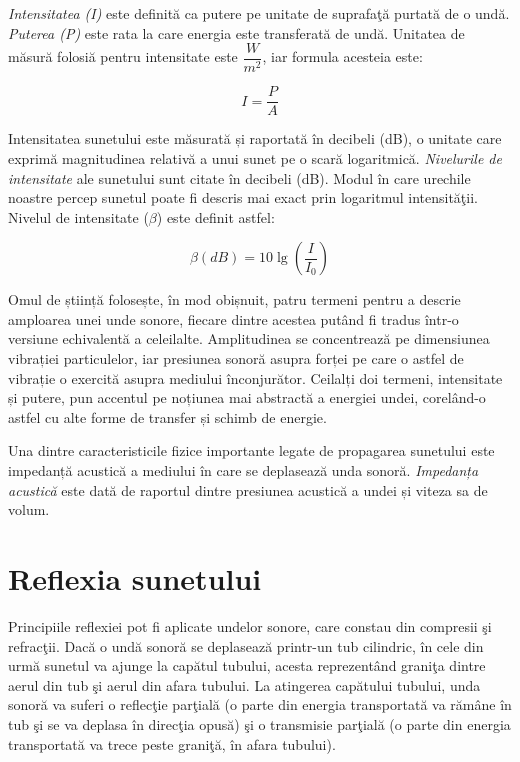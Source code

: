 	{\it{Intensitatea (I)}} este definit\u{a} ca putere pe unitate de suprafa\c{t}\u{a} purtat\u{a} de o und\u{a}. {\it{Puterea (P)}} este rata la care energia este transferat\u{a} de und\u{a}. Unitatea de m\u{a}sur\u{a} folosi\u{a} pentru intensitate este $\dfrac{W}{m^2}$, iar formula acesteia este:
	
	\begin{equation}
	I=\frac{P}{A}
	\end{equation}
	 	
	Intensitatea sunetului este măsurată și raportată în decibeli (dB), o unitate care exprimă magnitudinea relativă a unui sunet pe o scară logaritmică. {\it{Nivelurile de intensitate}} ale sunetului sunt citate în decibeli (dB). Modul în care urechile noastre percep sunetul poate fi descris mai exact prin logaritmul intensit\u{a}\c{t}ii. Nivelul de intensitate ($\beta$) este definit astfel:
	
	\begin{equation}
	\beta(dB) = 10 \lg\left(\dfrac{I}{I_0}\right) 
	\end{equation}

	Omul de știință folosește, în mod obișnuit, patru termeni pentru a descrie amploarea unei unde sonore, fiecare dintre acestea putând fi tradus într-o versiune echivalentă a celeilalte. Amplitudinea se concentrează pe dimensiunea vibrației particulelor, iar presiunea sonoră asupra forței pe care o astfel de vibrație o exercită asupra mediului înconjurător. Ceilalți doi termeni, intensitate și putere, pun accentul pe noțiunea mai abstractă a energiei undei, corelând-o astfel cu alte forme de transfer și schimb de energie.
	
	Una dintre caracteristicile fizice importante legate de propagarea sunetului este impedanță acustică a mediului în care se deplasează unda sonoră. \textit{Impedanța acustică} este dată de raportul dintre presiunea acustică a undei și viteza sa de volum.
	
	\section{Reflexia sunetului}
	
	Principiile reflexiei pot fi aplicate undelor sonore, care constau din compresii \c{s}i refrac\c{t}ii. Dac\u{a} o und\u{a} sonor\u{a} se deplaseaz\u{a} printr-un tub cilindric, \^{i}n cele din urm\u{a} sunetul va ajunge la cap\u{a}tul tubului, acesta reprezent\^{a}nd grani\c{t}a dintre aerul din tub \c{s}i aerul din afara tubului. La atingerea cap\u{a}tului tubului, unda sonor\u{a} va suferi o reflec\c{t}ie par\c{t}ial\u{a} (o parte din energia transportat\u{a} va r\u{a}m\^{a}ne \^{i}n tub \c{s}i se va deplasa \^{i}n direc\c{t}ia opus\u{a}) \c{s}i o transmisie par\c{t}ial\u{a} (o parte din energia transportat\u{a} va trece peste grani\c{t}\u{a}, \^{i}n afara tubului).
	 
